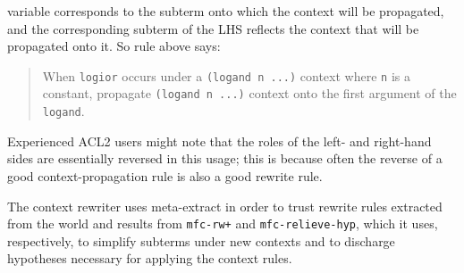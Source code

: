 variable corresponds to the subterm onto which the context will be
propagated, and the corresponding subterm of the LHS reflects the
context that will be propagated onto it.  So rule above says:
\begin{quote}
When \texttt{logior} occurs under a \texttt{(logand n ...)} context where
\texttt{n} is a constant, propagate \texttt{(logand n ...)} context
onto the first argument of the \texttt{logand}.
\end{quote}
\noindent Experienced ACL2 users might note that the roles of the
left- and right-hand sides are essentially reversed in this usage;
this is because often the reverse of a good context-propagation rule
is also a good rewrite rule.

\begin{comment}
[From Matt] I'm not sure if I'm following what's above.  At first it
seemed to me that the displayed rule is intended to explain how
contexts are propagated in the logbitp example above.  Now I think
(but I'm not sure) that it's just an analogous sort of rule, but we'd
need for example to propagate into logior expressions to do that
logbitp example.  Can you clarify a bit?

[Sol] Fixed this up a bit, hopefully makes more sense now.  The
original logbitp example was totally bogus so thanks for catching
that.  The new example is actually correct (slight change to
logand-pass-loghead-context-1 in centaur/bitops/congruences.lisp).
\end{comment}

The context rewriter uses meta-extract in order to trust rewrite rules
extracted from the world and results from \texttt{mfc-rw+} and
\texttt{mfc-relieve-hyp}, which it uses, respectively, to simplify
subterms under new contexts and to discharge hypotheses necessary for
applying the context rules.

\begin{comment}
[From Matt] I haven't given the following any thought at all, but I
wonder if patterned congruences could provide an alternate solution.
Maybe that doesn't matter, but if offhand you (Sol) think so, you
could add such words and reference the ITP 2014 paper on patterned
congruences (I'll send you a reference if you ask).

[Sol] Patterned congruences are still only capable of propagating
contexts that have defined equivalence relations, whereas this and
Nary support something like ``parameterized equivalences'' (really via
parameterized fixing functions such as, e.g., loghead).
\end{comment}

